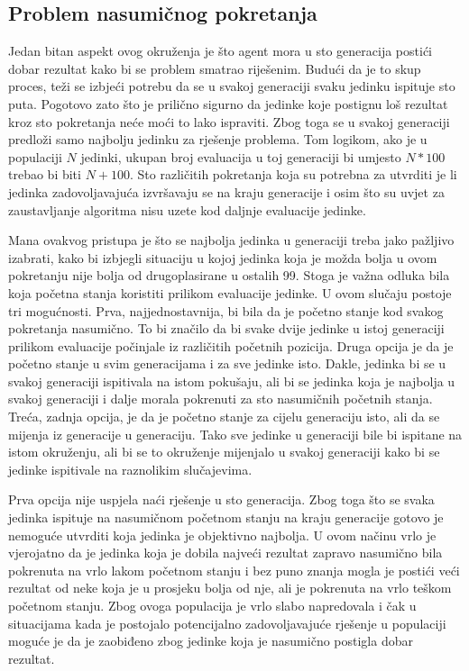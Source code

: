 \documentclass[times, utf8, diplomski, numeric]{fer}
\begin{document}
\subsection{Problem nasumičnog pokretanja}
Jedan bitan aspekt ovog okruženja je što agent mora u sto generacija postići dobar rezultat kako bi se problem smatrao riješenim. Budući da je to skup proces, teži se izbjeći potrebu da se u svakoj generaciji svaku jedinku ispituje sto puta. Pogotovo zato što je prilično sigurno da jedinke koje postignu loš rezultat kroz sto pokretanja neće moći to lako ispraviti. Zbog toga se u svakoj generaciji predloži samo najbolju jedinku za rješenje problema. Tom logikom, ako je u populaciji $N$ jedinki, ukupan broj evaluacija u toj generaciji bi umjesto $N * 100$ trebao bi biti $N + 100$. Sto različitih pokretanja koja su potrebna za utvrditi je li jedinka zadovoljavajuća izvršavaju se na kraju generacije i osim što su uvjet za zaustavljanje algoritma nisu uzete kod daljnje evaluacije jedinke.

Mana ovakvog pristupa je što se najbolja jedinka u generaciji treba jako pažljivo izabrati, kako bi izbjegli situaciju u kojoj jedinka koja je možda bolja u ovom pokretanju nije bolja od drugoplasirane u ostalih 99. Stoga je važna odluka bila koja početna stanja koristiti prilikom evaluacije jedinke. U ovom slučaju postoje tri mogućnosti. Prva, najjednostavnija, bi bila da je početno stanje kod svakog pokretanja nasumično. To bi značilo da bi svake dvije jedinke u istoj generaciji prilikom evaluacije počinjale iz različitih početnih pozicija. Druga opcija je da je početno stanje u svim generacijama i za sve jedinke isto. Dakle, jedinka bi se u svakoj generaciji ispitivala na istom pokušaju, ali bi se jedinka koja je najbolja u svakoj generaciji i dalje morala pokrenuti za sto nasumičnih početnih stanja. Treća, zadnja opcija, je da je početno stanje za cijelu generaciju isto, ali da se mijenja iz generacije u generaciju. Tako sve jedinke u generaciji bile bi ispitane na istom okruženju, ali bi se to okruženje mijenjalo u svakoj generaciji kako bi se jedinke ispitivale na raznolikim slučajevima.

Prva opcija nije uspjela naći rješenje u sto generacija. Zbog toga što se svaka jedinka ispituje na nasumičnom početnom stanju na kraju generacije gotovo je nemoguće utvrditi koja jedinka je objektivno najbolja. U ovom načinu vrlo je vjerojatno da je jedinka koja je dobila najveći rezultat zapravo nasumično bila pokrenuta na vrlo lakom početnom stanju i bez puno znanja mogla je postići veći rezultat od neke koja je u prosjeku bolja od nje, ali je pokrenuta na vrlo teškom početnom stanju. Zbog ovoga populacija je vrlo slabo napredovala i čak u situacijama kada je postojalo potencijalno zadovoljavajuće rješenje u populaciji moguće je da je zaobiđeno zbog jedinke koja je nasumično postigla dobar rezultat.
\end{document}
